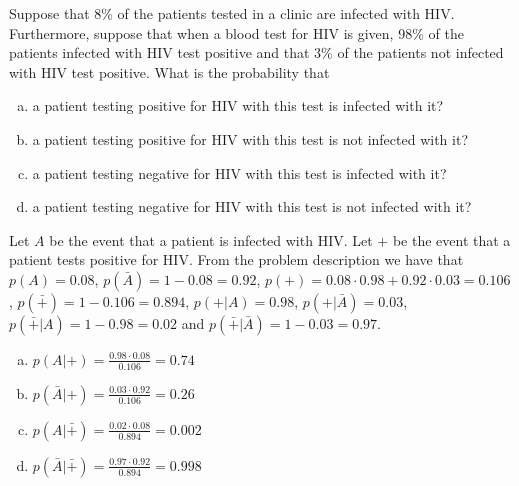 \documentclass[../main.tex]{subfiles}
\begin{document}
Suppose that 8\% of the patients tested in a clinic are infected with HIV.
Furthermore, suppose that when a blood test for HIV is given, 98\% of the patients infected with HIV test positive and that 3\% of the patients not infected with HIV test positive.
What is the probability that
\begin{enumerate}[a)]
	\item a patient testing positive for HIV with this test is infected with it?
	\item a patient testing positive for HIV with this test is not infected with it?
	\item a patient testing negative for HIV with this test is infected with it?
	\item a patient testing negative for HIV with this test is not infected with it?
\end{enumerate}

\solution
Let $A$ be the event that a patient is infected with HIV. Let $+$ be the event that a patient tests positive for HIV.
From the problem description we have that $p(A) = 0.08$, $p(\bar{A}) = 1-0.08 = 0.92$, $p(+) = 0.08 \cdot 0.98 + 0.92
\cdot 0.03 = 0.106$, $p(\bar{+}) = 1-0.106 = 0.894$, $p(+|A) = 0.98$, $p(+|\bar{A}) = 0.03$, $p(\bar{+}|A) = 
1-0.98 = 0.02$ and $p(\bar{+}|\bar{A}) = 1-0.03 = 0.97$.  
\begin{enumerate}[a)]
	\item $p(A|+) = \frac{0.98 \cdot 0.08}{0.106} = 0.74$
	\item $p(\bar{A}|+) = \frac{0.03 \cdot 0.92}{0.106} = 0.26$
	\item $p(A|\bar{+}) = \frac{0.02 \cdot 0.08}{0.894} = 0.002$
	\item $p(\bar{A}|\bar{+}) = \frac{0.97 \cdot 0.92}{0.894} = 0.998$
\end{enumerate}
\end{document}
